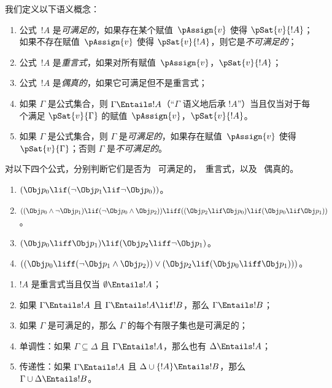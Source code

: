\documentclass[../../../include/open-logic-section]{subfiles}
\begin{document}


我们定义以下语义概念：

\begin{defn}
\begin{enumerate}
\item 公式~$!A$ 是\emph{可满足的}，如果存在某个赋值~$\pAssign{v}$ 使得 $\pSat{v}{!A}$；如果不存在赋值~$\pAssign{v}$ 使得 $\pSat{v}{!A}$，则它是\emph{不可满足的}；
\item 公式~$!A$ 是\emph{重言式}，如果对所有赋值~$\pAssign{v}$，$\pSat{v}{!A}$；
\item 公式~$!A$ 是\emph{偶真的}，如果它可满足但不是重言式；
\item 如果 $\Gamma$ 是公式集合，则 $\Gamma \Entails !A$（“$\Gamma$ 语义地后承 $!A$”）当且仅当对于每个满足 $\pSat{v}{\Gamma}$ 的赋值~$\pAssign{v}$，$\pSat{v}{!A}$。
\item 如果 $\Gamma$ 是公式集合，则 $\Gamma$ 是\emph{可满足的}，如果存在赋值~$\pAssign{v}$ 使得 $\pSat{v}{\Gamma}$；否则 $\Gamma$ 是\emph{不可满足的}。
\end{enumerate}
\end{defn}

\begin{prob}
对以下四个公式，分别判断它们是否为 ~可满足的，~重言式，以及 ~偶真的。
\begin{enumerate}
  \item \( ( \Obj p_0 \lif ( \lnot \Obj p_1 \lif \lnot \Obj p_0 ) ) \)。
  \item \( ( ( \Obj p_0 \land \lnot \Obj p_1 ) \lif ( \lnot \Obj p_0 \land \Obj p_2 )) \liff ( ( \Obj p_2 \lif \Obj p_0 ) \lif ( \Obj p_0 \lif \Obj p_1 )) \)。
  \item \( ( \Obj p_0 \liff \Obj p_1 ) \lif ( \Obj p_2 \liff \lnot \Obj p_1 ) \)。
  \item \( (( \Obj p_0 \liff ( \lnot \Obj p_1 \land \Obj p_2 )) \lor ( \Obj p_2 \lif ( \Obj p_0 \liff \Obj p_1 ))) \)。
\end{enumerate}
\end{prob}

\begin{prop}
\begin{enumerate}
\item $!A$ 是重言式当且仅当 $\emptyset \Entails !A$；
\item 如果 $\Gamma \Entails !A$ 且 $\Gamma \Entails !A \lif !B$，那么 $\Gamma \Entails !B$；
\item 如果 $\Gamma$ 是可满足的，那么 $\Gamma$ 的每个有限子集也是可满足的；
\item {} 单调性：如果 $\Gamma \subseteq \Delta$ 且 $\Gamma \Entails !A$，那么也有 $\Delta \Entails !A$；
\item {} 传递性：如果 $\Gamma \Entails !A$ 且 $\Delta \cup \{ !A\} \Entails !B$，那么 $\Gamma \cup \Delta \Entails !B$。
\end{enumerate}
\end{prop}
\end{document}
